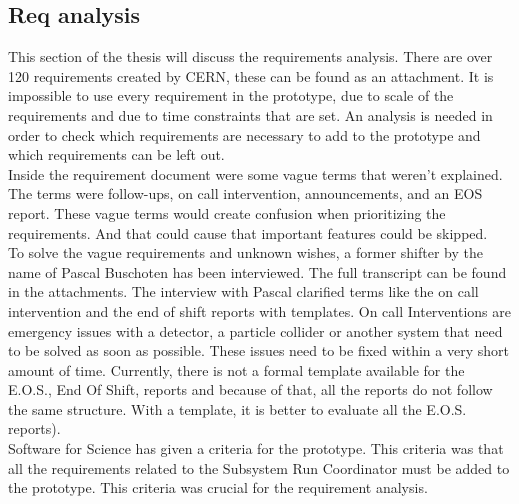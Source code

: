 \documentclass[paper=a4, fontsize=11pt,twoside]{scrartcl}	%
\begin{document}


\newpage
\subsection{Req analysis}
This section of the thesis will discuss the requirements analysis. There are over 120 requirements created by CERN, these can be found as an attachment. It is impossible to use every requirement in the prototype, due to scale of the requirements and due to time constraints that are set. An analysis is needed in order to check which requirements are necessary to add to the prototype and which requirements can be left out.  \\
Inside the requirement document were some vague terms that weren't explained. The terms were follow-ups, on call intervention, announcements, and an EOS report. These vague terms would create confusion when prioritizing the requirements. And that could cause that important features could be skipped. \\
To solve the vague requirements and unknown wishes, a former shifter by the name of Pascal Buschoten has been interviewed. The full transcript can be found in the attachments. The interview with Pascal clarified  terms like the on call intervention and the end of shift reports with templates. On call Interventions are emergency issues with a detector, a particle collider or another system that need to be solved as soon as possible. These issues need to be fixed within a very short amount of time. Currently, there is not a formal template available for the E.O.S., End Of Shift, reports  and because of that, all the reports do not follow the same structure. With a template, it is better to evaluate all the E.O.S. reports).\\
Software for Science has given a criteria for the prototype. This criteria was that all the requirements related to the Subsystem Run Coordinator must be added to the prototype. This criteria was crucial for the requirement analysis. \\
\end{document}
